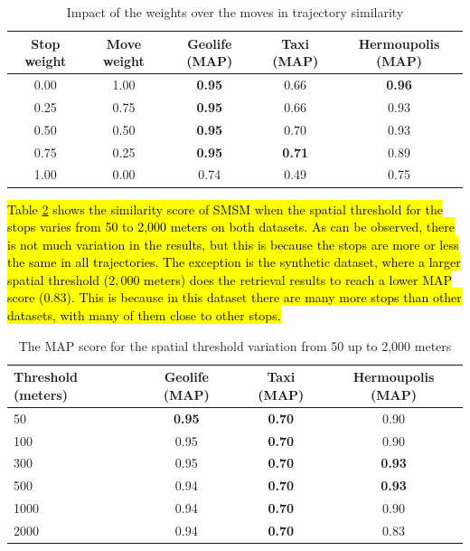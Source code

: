 \documentclass[12pt]{article}
\begin{document}
\begin{table}[ht!]
  \scriptsize
  \centering
  \begin{tabular}{|c|c|c|c|c|}
  	\hline
Stop weight & Move weight & Geolife (MAP) & Taxi (MAP) & Hermoupolis (MAP) \\
  	\hline
0.00 & 1.00 & \textbf{0.95} & 0.66 & \textbf{0.96}\\
0.25 & 0.75 & \textbf{0.95} & 0.66 & 0.93\\
0.50 & 0.50 & \textbf{0.95} & 0.70 & 0.93\\
0.75 & 0.25 & \textbf{0.95} & \textbf{0.71} & 0.89\\
1.00 & 0.00 & 0.74 & 0.49 & 0.75 \\
    \hline
  \end{tabular}
  \caption{Impact of the weights over the moves in trajectory similarity}
  \label{tab:sensibility_stopmove}
\end{table}

\hl{Table {\ref{tab:sensibility_spatial_thresholds}} shows the similarity score of SMSM when the spatial threshold for the stops varies from 50 to 2,000 meters on both datasets. As can be observed, there is not much variation in the results, but this is because the stops are more or less the same in all trajectories. The exception is the synthetic dataset, where a larger spatial threshold ($2,000$ meters) does the retrieval results to reach a lower MAP score ($0.83$). This is because in this dataset there are many more stops than other datasets, with many of them close to other stops.}

\begin{table}[ht!]
  \scriptsize
  \centering
  \begin{tabular}{|l|c|c|c|}
  	\hline
Threshold (meters) & Geolife (MAP) & Taxi (MAP) & Hermoupolis (MAP)\\
  	\hline
50 & \textbf{0.95} & \textbf{0.70} & 0.90\\
100 & 0.95 & \textbf{0.70}  & 0.90\\
300 & 0.95 & \textbf{0.70} & \textbf{0.93} \\
500 & 0.94 & \textbf{0.70} & \textbf{0.93}\\
1000 & 0.94 & \textbf{0.70} & 0.90\\
2000 & 0.94 & \textbf{0.70} & 0.83\\
    \hline
  \end{tabular}
  \caption{The MAP score for the spatial threshold variation from 50 up to 2,000 meters}
  \label{tab:sensibility_spatial_thresholds}
\end{table}
\end{document}
